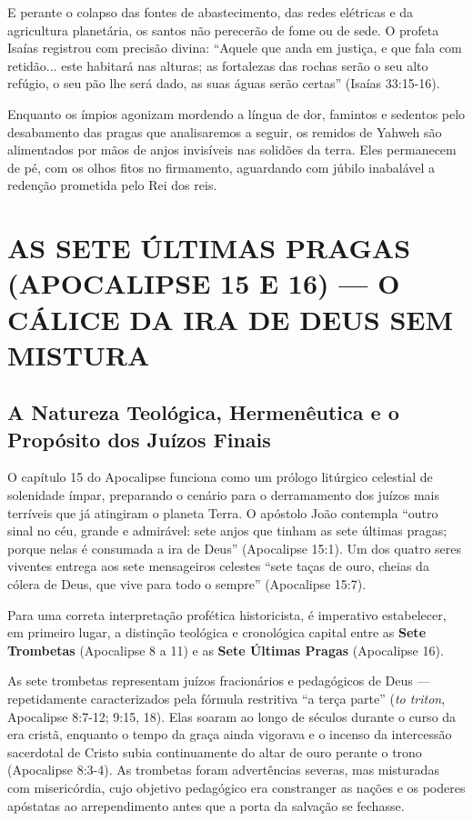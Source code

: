 \documentclass[11pt,a4paper,openany]{book}
\begin{document}
E perante o colapso das fontes de abastecimento, das redes elétricas e da agricultura planetária, os santos não perecerão de fome ou de sede. O profeta Isaías registrou com precisão divina:
``Aquele que anda em justiça, e que fala com retidão... este habitará nas alturas; as fortalezas das rochas serão o seu alto refúgio, o seu pão lhe será dado, as suas águas serão certas'' (Isaías 33:15-16).

Enquanto os ímpios agonizam mordendo a língua de dor, famintos e sedentos pelo desabamento das pragas que analisaremos a seguir, os remidos de Yahweh são alimentados por mãos de anjos invisíveis nas solidões da terra. Eles permanecem de pé, com os olhos fitos no firmamento, aguardando com júbilo inabalável a redenção prometida pelo Rei dos reis.



\section{AS SETE ÚLTIMAS PRAGAS (APOCALIPSE 15 E 16) — O CÁLICE DA IRA DE DEUS SEM MISTURA}



\subsection{A Natureza Teológica, Hermenêutica e o Propósito dos Juízos Finais}


O capítulo 15 do Apocalipse funciona como um prólogo litúrgico celestial de solenidade ímpar, preparando o cenário para o derramamento dos juízos mais terríveis que já atingiram o planeta Terra. O apóstolo João contempla ``outro sinal no céu, grande e admirável: sete anjos que tinham as sete últimas pragas; porque nelas é consumada a ira de Deus'' (Apocalipse 15:1). Um dos quatro seres viventes entrega aos sete mensageiros celestes ``sete taças de ouro, cheias da cólera de Deus, que vive para todo o sempre'' (Apocalipse 15:7).

Para uma correta interpretação profética historicista, é imperativo estabelecer, em primeiro lugar, a distinção teológica e cronológica capital entre as \textbf{Sete Trombetas} (Apocalipse 8 a 11) e as \textbf{Sete Últimas Pragas} (Apocalipse 16).

As sete trombetas representam juízos fracionários e pedagógicos de Deus — repetidamente caracterizados pela fórmula restritiva ``a terça parte'' (\textit{to triton}, Apocalipse 8:7-12; 9:15, 18). Elas soaram ao longo de séculos durante o curso da era cristã, enquanto o tempo da graça ainda vigorava e o incenso da intercessão sacerdotal de Cristo subia continuamente do altar de ouro perante o trono (Apocalipse 8:3-4). As trombetas foram advertências severas, mas misturadas com misericórdia, cujo objetivo pedagógico era constranger as nações e os poderes apóstatas ao arrependimento antes que a porta da salvação se fechasse.
\end{document}

